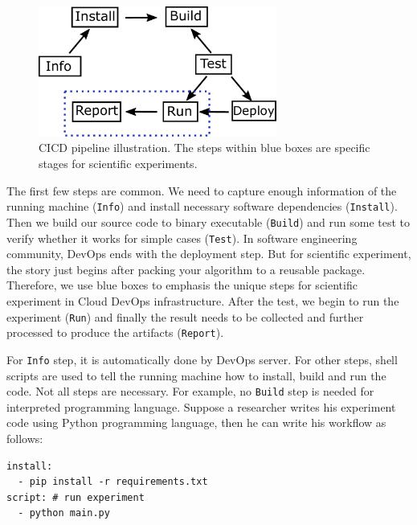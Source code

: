 \documentclass{IEEEcsmag}
\begin{document}
\begin{figure}[!ht]
\centerline{\includegraphics[width=18.5pc]{workflow.pdf}}
\caption{CICD pipeline illustration. The steps within blue boxes are specific stages for scientific experiments. }\label{fig:cicdworkflow}
\end{figure}

The first few steps are common. We need to capture enough information of the running machine (\texttt{Info}) and install necessary software dependencies (\texttt{Install}). Then we build our source code to binary executable (\texttt{Build}) and run some test to verify whether it works for simple cases (\texttt{Test}). In software engineering community, DevOps ends with the deployment step. But for scientific experiment, the story just begins after packing your algorithm to a reusable package. Therefore, we use blue boxes to emphasis the unique steps for scientific experiment in Cloud DevOps infrastructure. After the test, we begin to run the experiment (\texttt{Run}) and finally the result needs to be collected and further processed to produce the artifacts (\texttt{Report}).

For \texttt{Info} step, it is automatically done by DevOps server. For other steps, shell scripts are used to tell the running machine how to install, build and run the code. Not all steps are necessary. For example, no \texttt{Build} step is needed for interpreted programming language. Suppose a researcher writes his experiment code using Python programming language, then he can write his workflow as follows:
\begin{lstlisting}[caption={workflow description}, label={lst:wd}, basicstyle={\small}]
install: 
  - pip install -r requirements.txt
script: # run experiment
  - python main.py
\end{lstlisting}
\end{document}

